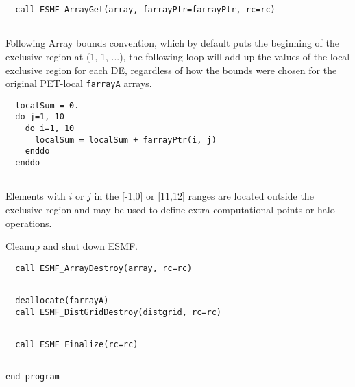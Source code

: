  \begin{verbatim}
  call ESMF_ArrayGet(array, farrayPtr=farrayPtr, rc=rc)
 
\end{verbatim}
 

   Following Array bounds convention, which by default puts the beginning of 
   the exclusive region at (1, 1, ...), the following loop will add up the 
   values of the local exclusive region for each DE, regardless of how the bounds
   were chosen for the original PET-local {\tt farrayA} arrays. 

 \begin{verbatim}
  localSum = 0.
  do j=1, 10
    do i=1, 10
      localSum = localSum + farrayPtr(i, j)
    enddo
  enddo
 
\end{verbatim}
 

   Elements with $i$ or $j$ in the [-1,0] or [11,12] ranges are located outside the
   exclusive region and may be used to define extra computational points or 
   halo operations.
  
   Cleanup and shut down ESMF. 

 \begin{verbatim}
  call ESMF_ArrayDestroy(array, rc=rc)
 
\end{verbatim}
 

 \begin{verbatim}
  deallocate(farrayA)
  call ESMF_DistGridDestroy(distgrid, rc=rc)
 
\end{verbatim}
 

 \begin{verbatim}
  call ESMF_Finalize(rc=rc)
 
\end{verbatim}
 

 \begin{verbatim}
end program
 
\end{verbatim}

\setlength{\parskip}{\oldparskip}
\setlength{\parindent}{\oldparindent}
\setlength{\baselineskip}{\oldbaselineskip}
